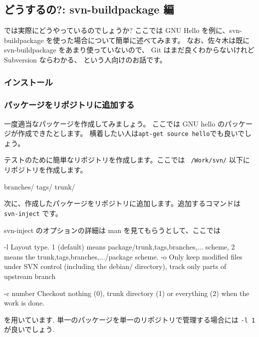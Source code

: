 \documentclass[mingoth,a4paper]{jsarticle}
\begin{document}
\subsection{どうするの?: svn-buildpackage 編}

では実際にどうやっているのでしょうか?
ここでは GNU Hello を例に、svn-buildpackage を使った場合について簡単に述べてみます。
なお、佐々木は既に svn-buildpackage をあまり使っていないので、
Git はまだ良くわからないけれど Subversion ならわかる、 という人向けのお話です。

\subsubsection{インストール}
\begin{commandline}
\end{commandline}

\subsubsection{パッケージをリポジトリに追加する}

一度適当なパッケージを作成してみましょう。 ここでは GNU hello のパッケージが作成できたとします。
横着したい人は{\tt{apt-get source hello}}でも良いでしょう。

テストのために簡単なリポジトリを作成します。ここでは {\tt{~/Work/svn/}} 以下にリポジトリを作成します。
\begin{commandline}
  branches/
  tags/
  trunk/
\end{commandline}
次に、作成したパッケージをリポジトリに追加します。追加するコマンドは {\tt{svn-inject}} です。
\begin{commandline}
\end{commandline}
svn-inject のオプションの詳細は man を見てもらうとして、ここでは
\begin{commandline}
      -l
          Layout type.
          1 (default) means package/{trunk,tags,branches,...} scheme,
          2 means the {trunk,tags,branches,...}/package scheme.
      -o
          Only keep modified files under SVN control (including the debian/ directory),
          track only parts of upstream branch

       -c number
          Checkout nothing (0), trunk directory (1) or everything (2) when
          the work is done.
\end{commandline}
を用いています. 単一のパッケージを単一のリポジトリで管理する場合には {\tt{-l 1}} が良いでしょう.
\end{document}

